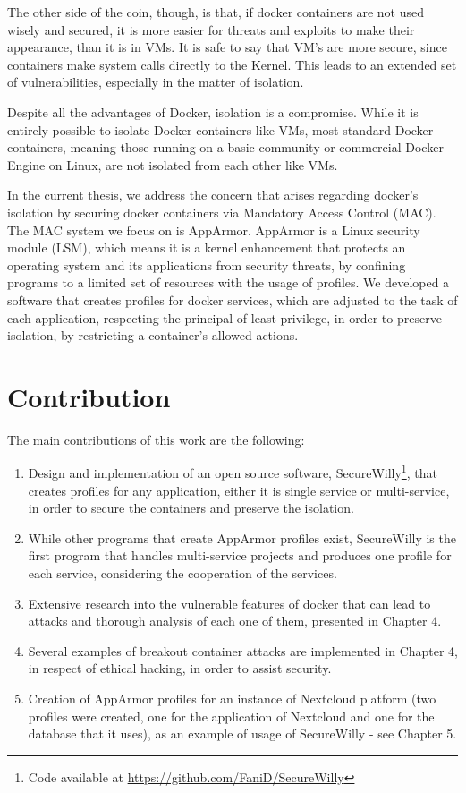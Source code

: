 The other side of the coin, though, is that, if docker containers are not used wisely and secured, it is more easier for threats and exploits to make their appearance, than it is in VMs. It is safe to say that VM's are more secure, since containers make system calls directly to the Kernel. This leads to an extended set of vulnerabilities, especially in the matter of isolation.

Despite all the advantages of Docker, isolation is a compromise. While it is entirely possible to isolate Docker containers like VMs, most standard Docker containers, meaning those running on a basic community or commercial Docker Engine on Linux, are not isolated from each other like VMs.

In the current thesis, we address the concern that arises regarding docker's isolation by securing docker containers via Mandatory Access Control (MAC). The MAC system we focus on is AppArmor. AppArmor is a Linux security module (LSM), which means it is a kernel enhancement that protects an operating system and its applications from security threats, by confining programs to a limited set of resources with the usage of profiles. We developed a software that creates profiles for docker services, which are adjusted to the task of each application, respecting the principal of least privilege, in order to preserve isolation, by restricting a container's allowed actions.

\section{Contribution}
The main contributions of this work are the following:
\begin{enumerate}
\item Design and implementation of an open source software, SecureWilly\footnote{Code available at \url{https://github.com/FaniD/SecureWilly}}, that creates profiles for any application, either it is single service or multi-service, in order to secure the containers and preserve the isolation.
\item While other programs that create AppArmor profiles exist, SecureWilly is the first program that handles multi-service projects and produces one profile for each service, considering the cooperation of the services.
\item Extensive research into the vulnerable features of docker that can lead to attacks and thorough analysis of each one of them, presented in Chapter 4.
\item Several examples of breakout container attacks are implemented in Chapter 4, in respect of ethical hacking, in order to assist security.
\item Creation of AppArmor profiles for an instance of Nextcloud platform (two profiles were created, one for the application of Nextcloud and one for the database that it uses), as an example of usage of SecureWilly - see Chapter 5.
\end{enumerate}

